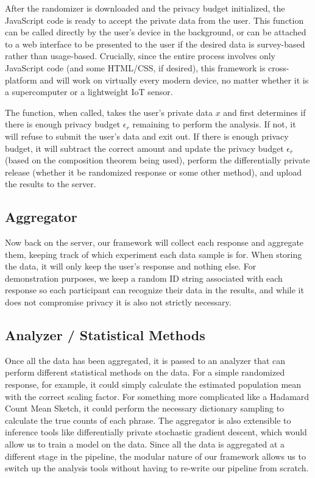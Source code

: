 \documentclass[12pt]{article}
\theoremstyle{definition}
\begin{document}
\bigskip

After the randomizer is downloaded and the privacy budget initialized, the JavaScript code is ready to accept the private data from the user. This function can be called directly by the user's device in the background, or can be attached to a web interface to be presented to the user if the desired data is survey-based rather than usage-based. Crucially, since the entire process involves only JavaScript code (and some HTML/CSS, if desired), this framework is cross-platform and will work on virtually every modern device, no matter whether it is a supercomputer or a lightweight IoT sensor.

\bigskip

The function, when called, takes the user's private data $x$ and first determines if there is enough privacy budget $\epsilon_r$ remaining to perform the analysis. If not, it will refuse to submit the user's data and exit out. If there is enough privacy budget, it will subtract the correct amount and update the privacy budget $\epsilon_r$ (based on the composition theorem being used), perform the differentially private release (whether it be randomized response or some other method), and upload the results to the server.

\subsection{Aggregator}

\noindent

Now back on the server, our framework will collect each response and aggregate them, keeping track of which experiment each data sample is for. When storing the data, it will only keep the user's response and nothing else. For demonstration purposes, we keep a random ID string associated with each response so each participant can recognize their data in the results, and while it does not compromise privacy it is also not strictly necessary.

\subsection{Analyzer / Statistical Methods}

\noindent

Once all the data has been aggregated, it is passed to an analyzer that can perform different statistical methods on the data. For a simple randomized response, for example, it could simply calculate the estimated population mean with the correct scaling factor. For something more complicated like a Hadamard Count Mean Sketch, it could perform the necessary dictionary sampling to calculate the true counts of each phrase. The aggregator is also extensible to inference tools like differentially private stochastic gradient descent, which would allow us to train a model on the data. Since all the data is aggregated at a different stage in the pipeline, the modular nature of our framework allows us to switch up the analysis tools without having to re-write our pipeline from scratch.
\end{document}
